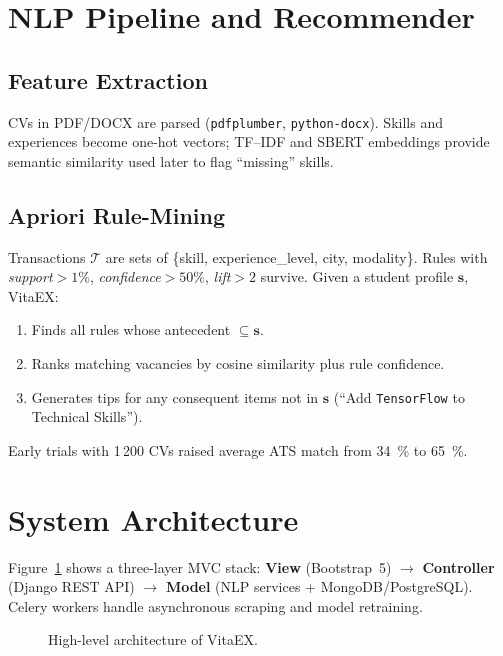 \documentclass[12pt,a4paper]{article}
\begin{document}
	\section{NLP Pipeline and Recommender}
	\subsection{Feature Extraction}
	CVs in PDF/DOCX are parsed (\texttt{pdfplumber}, \texttt{python-docx}). Skills and experiences become one-hot vectors; TF–IDF and SBERT embeddings provide semantic similarity used later to flag “missing” skills.
	
	\subsection{Apriori Rule-Mining}
	Transactions $\mathcal{T}$ are sets of \{skill, experience\_level, city, modality\}. Rules with \emph{support}$>1\%$, \emph{confidence}$>50\%$, \emph{lift}$>2$ survive. Given a student profile $\mathbf{s}$, VitaEX:
	\begin{enumerate}[label=\arabic*.]
		\item Finds all rules whose antecedent $\subseteq \mathbf{s}$.
		\item Ranks matching vacancies by cosine similarity plus rule confidence.
		\item Generates tips for any consequent items not in $\mathbf{s}$ (``Add \texttt{TensorFlow} to Technical Skills'').
	\end{enumerate}
	Early trials with 1\,200 CVs raised average ATS match from 34~\% to 65~\%.
	
	\section{System Architecture}
	Figure~\ref{fig:blocks} shows a three-layer MVC stack: \textbf{View} (Bootstrap~5) $\rightarrow$ \textbf{Controller} (Django REST API) $\rightarrow$ \textbf{Model} (NLP services + MongoDB/PostgreSQL). Celery workers handle asynchronous scraping and model retraining.
	
	\begin{figure}[ht]
		\centering
		\caption{High-level architecture of VitaEX.}
		\label{fig:blocks}
	\end{figure}
	
\end{document}
